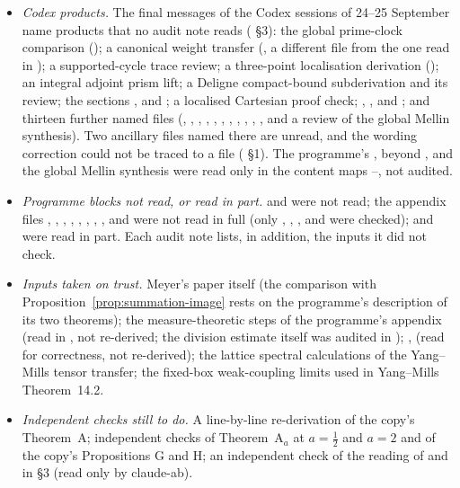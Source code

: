 \begin{itemize}
\item \emph{Codex products.} The final messages of the Codex sessions of 24--25 September name products that no audit note reads ( §3): the global prime-clock comparison (); a canonical weight transfer (, a different file from the one read in ); a supported-cycle trace review; a three-point localisation derivation (); an integral adjoint prism lift; a Deligne compact-bound subderivation and its review; the sections ,  and ; a localised Cartesian proof check; , ,  and ; and thirteen further named files (, , , , , , , , , , ,  and a review of the global Mellin synthesis). Two ancillary files named there are unread, and the  wording correction could not be traced to a file ( §1). The programme's ,  beyond ,  and the global Mellin synthesis  were read only in the content maps --, not audited.
\item \emph{Programme blocks not read, or read in part.}  and  were not read; the appendix files , , , , , , , ,  and  were not read in full (only , , ,  and  were checked);  and  were read in part. Each audit note lists, in addition, the inputs it did not check.
\item \emph{Inputs taken on trust.} Meyer's paper itself \cite{Meyer} (the comparison with Proposition~\ref{prop:summation-image} rests on the programme's description of its two theorems); the measure-theoretic steps of the programme's appendix  (read in , not re-derived; the division estimate itself was audited in ); ,  (read for correctness, not re-derived); the lattice spectral calculations of the Yang--Mills tensor transfer; the fixed-box weak-coupling limits used in Yang--Mills Theorem~14.2.
\item \emph{Independent checks still to do.} A line-by-line re-derivation of the copy's Theorem~A; independent checks of Theorem~A$_a$ at $a=\tfrac12$ and $a=2$ and of the copy's Propositions G and H; an independent check of the reading of  and  in  §3 (read only by claude-ab).

\end{itemize}
